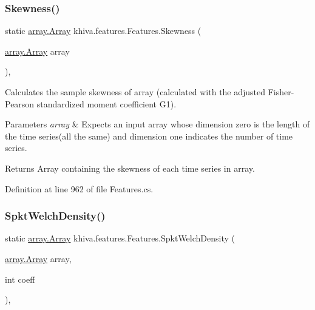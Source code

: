 \subsubsection{\texorpdfstring{Skewness()}{Skewness()}}
{\footnotesize\ttfamily static \mbox{\hyperlink{classkhiva_1_1array_1_1_array}{array.\+Array}} khiva.\+features.\+Features.\+Skewness (\begin{DoxyParamCaption}\item[{\mbox{\hyperlink{classkhiva_1_1array_1_1_array}{array.\+Array}}}]{array }\end{DoxyParamCaption})\hspace{0.3cm}{\ttfamily [inline]}, {\ttfamily [static]}}



Calculates the sample skewness of array (calculated with the adjusted Fisher-\/\+Pearson standardized moment coefficient G1). 


\begin{DoxyParams}{Parameters}
{\em array} & Expects an input array whose dimension zero is the length of the time series(all the same) and dimension one indicates the number of time series.\\
\hline
\end{DoxyParams}
\begin{DoxyReturn}{Returns}
Array containing the skewness of each time series in array.
\end{DoxyReturn}


Definition at line 962 of file Features.\+cs.

\mbox{\label{classkhiva_1_1features_1_1_features_a96814e8fb33d72bd2ba7cb552bcf4d02}} 
\subsubsection{\texorpdfstring{Spkt\+Welch\+Density()}{SpktWelchDensity()}}
{\footnotesize\ttfamily static \mbox{\hyperlink{classkhiva_1_1array_1_1_array}{array.\+Array}} khiva.\+features.\+Features.\+Spkt\+Welch\+Density (\begin{DoxyParamCaption}\item[{\mbox{\hyperlink{classkhiva_1_1array_1_1_array}{array.\+Array}}}]{array,  }\item[{int}]{coeff }\end{DoxyParamCaption})\hspace{0.3cm}{\ttfamily [inline]}, {\ttfamily [static]}}



